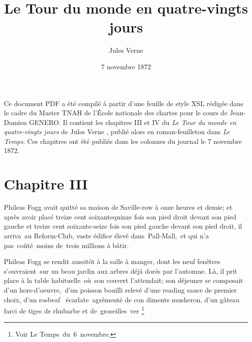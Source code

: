 \documentclass[]{book}
\title{\textbf{Le Tour du monde en quatre-vingts jours}}
\author{
               Jules 
               Verne
            }
\date{7 novembre 1872}
\begin{document}
            \maketitle
  
            \pagestyle{fancy}
            \fancyhf{}
            \fancyfoot[C]{\thepage}
            \renewcommand{\headrulewidth}{1pt}

    
 Ce document PDF a été compilé à partir d'une feuille de style XSL rédigée dans le cadre du Master TNAH de l'École nationale des chartes pour le cours de Jean-Damien GENERO.
            Il contient les chapitres III et IV du \textit{Le Tour du monde en quatre-vingts jours} de 
               Jules 
               Verne
            , publié alors en roman-feuilleton dans \textit{Le Temps}. Ces chapitres ont été publiés dans les colonnes du journal le 7 novembre 1872.
        
\newpage
    
            
               
         
               
         
            \chapter{Chapitre III}
            
            
                  
               Phileas Fogg avait quitté sa maison de
               Saville-row à onze heures et demie; et 
               après avoir placé treize cent soixantequinze fois son pied droit devant son pied
               gauche et treize cent soixante-seize fois
               son pied gauche devant son pied droit, il
               arriva au Reform-Club, vaste édifice élevé
               dans Pall-Mall\index[placeName]{{}}, et qui n'a pas coûté moins
               de trois millions à bâtir.
               
               Phileas Fogg se rendit aussitôt à la
               salle à manger, dont les neuf fenêtres
               s'ouvraient sur un beau jardin aux arbres
               déjà dorés par l'automne. Là, il prit place
               à la table habituelle où son couvert l'attendait; son déjeuner se composait d'un
               hors-d’oeuvre, d'un poisson bouilli relevé
               d'une reading sauce de premier choix,
               d'un rosbeaf  écarlate agrémenté de con
               diments musheron, d'un gâteau farci
               de tiges de rhubarbe et de groseilles ver
               \footnote{Voir Le Temps du 6 novembre.}  
               
\end{document}
